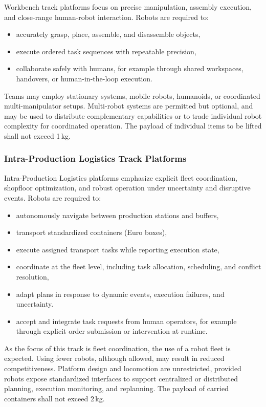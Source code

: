 \documentclass[letterpaper, 11pt]{extarticle}
\begin{document}
Workbench track platforms focus on precise manipulation, assembly execution, and close-range human-robot interaction. Robots are required to:
\begin{itemize}
    \item accurately grasp, place, assemble, and disassemble objects,
    \item execute ordered task sequences with repeatable precision,
    \item collaborate safely with humans, for example through shared workspaces, handovers, or human-in-the-loop execution.
\end{itemize}

Teams may employ stationary systems, mobile robots, humanoids, or coordinated multi-manipulator setups. Multi-robot systems are permitted but optional, and may be used to distribute complementary capabilities or to trade individual robot complexity for coordinated operation. The payload of individual items to be lifted shall not exceed 1\,kg.

\subsubsection{Intra-Production Logistics Track Platforms}

Intra-Production Logistics platforms emphasize explicit fleet coordination, shopfloor optimization, and robust operation under uncertainty and disruptive events. Robots are required to:
\begin{itemize}
    \item autonomously navigate between production stations and buffers,
    \item transport standardized containers (Euro boxes),
    \item execute assigned transport tasks while reporting execution state,
    \item coordinate at the fleet level, including task allocation, scheduling, and conflict resolution,
    \item adapt plans in response to dynamic events, execution failures, and uncertainty.
    \item accept and integrate task requests from human operators, for example through explicit order submission or intervention at runtime.
\end{itemize}

As the focus of this track is fleet coordination, the use of a robot fleet is expected.
Using fewer robots, although allowed, may result in reduced competitiveness.
Platform design and locomotion are unrestricted, provided robots expose standardized interfaces to support centralized or distributed planning, execution monitoring, and replanning. The payload of carried containers shall not exceed 2\,kg.
\end{document}
